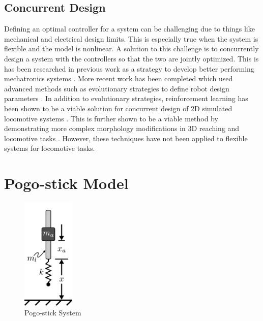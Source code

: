 \documentclass[twocolumn,10pt]{asme2e}
\begin{document}
\subsection{Concurrent Design}
\label{sec:control_design}
%
Defining an optimal controller for a system can be challenging due to things like mechanical and electrical design limits. This is especially true when the system is flexible and the model is nonlinear. A solution to this challenge is to concurrently design a system with the controllers so that the two are jointly optimized. This is has been researched in previous work as a strategy to develop better performing mechatronics systems \cite{Li2001}.  More recent work has been completed which used advanced methods such as evolutionary strategies to define robot design parameters \cite{Wang2019}. In addition to evolutionary strategies, reinforcement learning has been shown to be a viable solution for concurrent design of 2D simulated locomotive systems \cite{Ha2019j}. This is further shown to be a viable method by demonstrating more complex morphology modifications in 3D reaching and locomotive tasks \cite{Schaff2019e}. However, these techniques have not been applied to flexible systems for locomotive tasks. 



\section{Pogo-stick Model}
\label{sec:model}
%
	\begin{figure}[t]
		\begin{center}
			\includegraphics[width=2.5cm]{figures/pogo_system.pdf}
		\end{center}
		\caption{Pogo-stick System}
		\label{fig:pogoStickSystem} 
	\end{figure}
\end{document}
